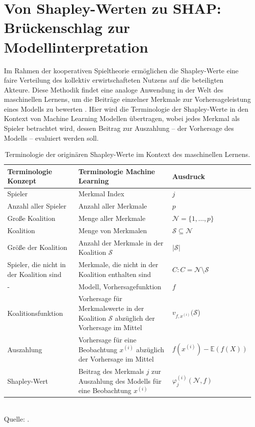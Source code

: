 \chapter{Von Shapley-Werten zu SHAP: Brückenschlag zur Modellinterpretation}

Im Rahmen der kooperativen Spieltheorie ermöglichen die Shapley-Werte eine faire Verteilung des kollektiv 
erwirtschafteten Nutzens auf die beteiligten Akteure. Diese Methodik findet eine analoge Anwendung 
in der Welt des maschinellen Lernens, um die Beiträge einzelner Merkmale zur Vorhersageleistung 
eines Modells zu bewerten \cite[S. 26]{Molnar_2023}. Hier wird die Terminologie der Shapley-Werte in den Kontext von Machine Learning 
Modellen übertragen, wobei jedes Merkmal als \glqq{}Spieler\grqq{} betrachtet wird, dessen Beitrag zur 
\glqq{}Auszahlung\grqq{} – der Vorhersage des Modells – evaluiert werden soll. 

\begin{table}[!h]
    \caption{Terminologie der originären Shapley-Werte im Kontext des maschinellen Lernens.}
    \footnotesize
    \begin{tabularx}{\textwidth}{XXX}
    \toprule
    Terminologie Konzept & Terminologie Machine Learning & Ausdruck \\
    \midrule
    Spieler & Merkmal Index & $j$ \\
    Anzahl aller Spieler & Anzahl aller Merkmale & $p$ \\
    Große Koalition & Menge aller Merkmale & $\mathcal{N} = \{1, \ldots, p\}$\\
    Koalition & Menge von Merkmalen & $\mathcal{S} \subseteq \mathcal{N}$ \\
    Größe der Koalition & Anzahl der Merkmale in der Koalition $\mathcal{S}$ & $|\mathcal{S}|$\\
    Spieler, die nicht in der Koalition sind & Merkmale, die nicht in der Koalition enthalten sind & $C: C = \mathcal{N} \setminus \mathcal{S}$ \\
    - & Modell, Vorhersagefunktion & $f$ \\ 
    Koalitionsfunktion & Vorhersage für Merkmalswerte in der Koalition $\mathcal{S}$ abzüglich der Vorhersage im Mittel & $v_{f, x^{(i)}}(\mathcal{S}$)\\
    Auszahlung & Vorhersage für eine Beobachtung $x^{(i)}$ abzüglich der Vorhersage im Mittel & $f(x^{(i)}) -  \mathbb{E}(f(X))$\\
    Shapley-Wert & Beitrag des Merkmals $j$ zur Auszahlung des Modells für eine Beobachtung $x^{(i)}$& $\varphi_j^{(i)}(\mathcal{N}, f)$\\
    \bottomrule
    \end{tabularx}
    \label{tab:shapley_terms}
    \normalsize\\
    Quelle: \cite[S. 26]{Molnar_2023}.
\end{table}

